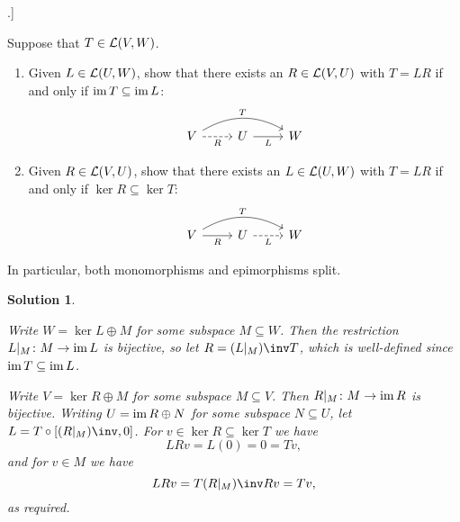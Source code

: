 \documentclass[article, a4paper, 11pt, oneside]{memoir}
\numberwithin{equation}{chapter}
\renewenvironment{exerciseframed}[1][]{%
    \setsepchar{.}%
    \readlist*\mylist{#1}%
    \def\exlabel{\mylist[1].\mylist[2]}%
    \begin{exerciseframed*}[\exlabel]%
    \label{ex:#1}%
}{%
    \end{exerciseframed*}%
}
\theoremstyle{nonumberplain}
\newtheorem{solution}{Solution}
\begin{document}
\begin{exerciseframed}[2.15]
    Suppose that $T \in \mathcal{L}(V,W)$.
    \begin{enumerate}
        \item Given $L \in \mathcal{L}(U,W)$, show that there exists an $R \in \mathcal{L}(V,U)$ with $T = LR$ if and only if $\operatorname{im} T \subseteq \operatorname{im} L$:
        \begin{equation*}
            \begin{tikzcd}
                V
                    \ar[rr, "T", bend left]
                    \ar[r, "R", dashed, swap]
                & U
                    \ar[r, "L", swap]
                & W
            \end{tikzcd}
        \end{equation*}

        \item Given $R \in \mathcal{L}(V,U)$, show that there exists an $L \in \mathcal{L}(U,W)$ with $T = LR$ if and only if $\ker R \subseteq \ker T$:
        \begin{equation*}
            \begin{tikzcd}
                V
                    \ar[rr, "T", bend left]
                    \ar[r, "R", swap]
                & U
                    \ar[r, "L", dashed, swap]
                & W
            \end{tikzcd}
        \end{equation*}
    \end{enumerate}
    In particular, both monomorphisms and epimorphisms split.
\end{exerciseframed}

\begin{solution}
\begin{solutionsec}
    \item Write $W = \ker L \oplus M$ for some subspace $M \subseteq W$. Then the restriction $L|_M \colon M \to \operatorname{im} L$ is bijective, so let $R = (L|_M)\inv T$, which is well-defined since $\operatorname{im} T \subseteq \operatorname{im} L$.
    
    \item Write $V = \ker R \oplus M$ for some subspace $M \subseteq V$. Then $R|_M \colon M \to \operatorname{im} R$ is bijective. Writing $U = \operatorname{im} R \oplus N$ for some subspace $N \subseteq U$, let $L = T \circ [(R|_M)\inv, 0]$. For $v \in \ker R \subseteq \ker T$ we have
    \begin{equation*}
        LRv
            = L(0)
            = 0
            = Tv,
    \end{equation*}
    and for $v \in M$ we have
    \begin{equation*}
        LRv
            = T(R|_M)\inv Rv
            = Tv,
    \end{equation*}
    as required.
\end{solutionsec}
\end{solution}
\end{document}
